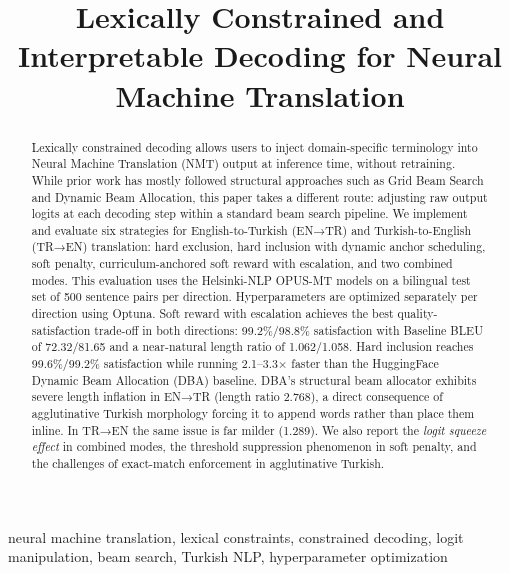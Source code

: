 \documentclass[conference]{IEEEtran}
\begin{document}
\title{Lexically Constrained and Interpretable Decoding for Neural Machine Translation}

\author{
}

\maketitle

\begin{abstract}
Lexically constrained decoding allows users to inject domain-specific terminology into Neural Machine Translation (NMT) output at inference time, without retraining. While prior work has mostly followed structural approaches such as Grid Beam Search and Dynamic Beam Allocation, this paper takes a different route: adjusting raw output logits at each decoding step within a standard beam search pipeline. We implement and evaluate six strategies for English-to-Turkish (EN→TR) and Turkish-to-English (TR→EN) translation: hard exclusion, hard inclusion with dynamic anchor scheduling, soft penalty, curriculum-anchored soft reward with escalation, and two combined modes. This evaluation uses the Helsinki-NLP OPUS-MT models on a bilingual test set of 500 sentence pairs per direction. Hyperparameters are optimized separately per direction using Optuna. Soft reward with escalation achieves the best quality-satisfaction trade-off in both directions: 99.2\%/98.8\% satisfaction with Baseline BLEU of 72.32/81.65 and a near-natural length ratio of 1.062/1.058. Hard inclusion reaches 99.6\%/99.2\% satisfaction while running 2.1--3.3$\times$ faster than the HuggingFace Dynamic Beam Allocation (DBA) baseline. DBA's structural beam allocator exhibits severe length inflation in EN→TR (length ratio 2.768), a direct consequence of agglutinative Turkish morphology forcing it to append words rather than place them inline. In TR→EN the same issue is far milder (1.289). We also report the \emph{logit squeeze effect} in combined modes, the threshold suppression phenomenon in soft penalty, and the challenges of exact-match enforcement in agglutinative Turkish.
\end{abstract}

\begin{IEEEkeywords}
neural machine translation, lexical constraints, constrained decoding, logit manipulation, beam search, Turkish NLP, hyperparameter optimization
\end{IEEEkeywords}
\end{document}
